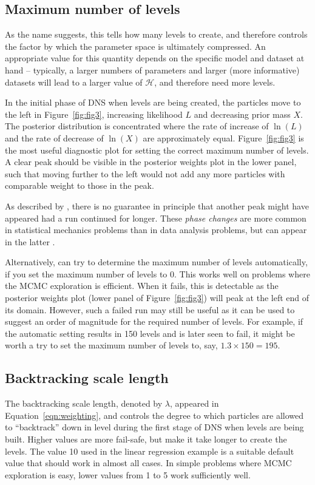 \documentclass[article]{jss}
\begin{document}
\subsection{Maximum number of levels}
As the name suggests, this tells  how many levels to create, and
therefore controls the factor by which the parameter space is ultimately
compressed. An appropriate value for this quantity depends on the specific
model and dataset at hand -- typically, a larger numbers of parameters
and larger (more informative) datasets will lead to a larger value of
$\mathcal{H}$, and therefore need more levels.

In the initial phase of DNS when levels are being created, the particles
move to the left in Figure~\ref{fig:fig3}, increasing likelihood $L$ and
decreasing prior mass $X$. The posterior distribution is concentrated
where the rate of increase of $\ln(L)$ and the rate of decrease of
$\ln(X)$ are approximately equal.
Figure~\ref{fig:fig3} is the most useful diagnostic
plot for setting the correct
maximum number of levels. A clear peak should be visible in the posterior
weights plot in the lower panel, such that moving further to the left would not
add any more particles with comparable weight to those in the peak.

As described by \citet{skilling2006nested}, there is no guarantee in principle that
another peak might have appeared had a run continued for longer. These
{\em phase changes} are more common in statistical mechanics problems than
in data analysis problems, but can appear in the latter
\citep[e.g.,][]{brewer2014inference, brewer2015fast}.

Alternatively,  can try to determine the maximum number of levels
automatically, if you set the maximum number of levels to 0. This works well
on problems where the MCMC exploration is efficient. When it fails, this
is detectable as the posterior weights plot (lower panel of
Figure~\ref{fig:fig3}) will peak at the left end of its domain. However,
such a failed run may still be useful as it can be used to suggest an order of
magnitude for the required number of levels. For example, if the automatic
setting results in 150 levels and is later seen to fail, it might be worth
a try to set the maximum number of levels to, say, $1.3 \times 150 = 195$.

\subsection{Backtracking scale length}
The backtracking scale length, denoted by $\lambda$, appeared in
Equation~\ref{eqn:weighting}, and controls the degree to which particles
are allowed to ``backtrack'' down in level during the first stage of DNS
when levels are being built. Higher values are more fail-safe, but
make it take longer to create the levels. The value 10 used in the linear
regression example is a suitable default value that should work in almost all
cases. In simple problems where MCMC exploration is easy, lower values
from 1 to 5 work sufficiently well.
\end{document}
